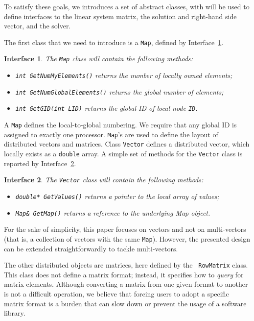 \documentclass[acmtocl]{acmtrans2m}
\newtheorem{interface}{Interface}[section]
\begin{document}
To satisfy these goals, we introduces a set of abstract classes, with will be
used to define interfaces to the linear system matrix, the solution and
right-hand side vector, and the solver.

\smallskip

The first class that we need to introduce is a {\tt Map}, defined by
Interface~\ref{int:map}.
\begin{interface}
\label{int:map}
The {\tt Map} class will contain the following methods:

\begin{itemize}
\item {\tt int GetNumMyElements()} returns the number of locally owned elements;
\item {\tt int GetNumGlobalElements()} returns the global number of elements;
\item {\tt int GetGID(int LID)} returns the global ID of local node {\tt ID}.
\end{itemize}
\end{interface}
A {\tt Map} defines the local-to-global numbering. We require that any global
ID is assigned to exactly one processor. {\tt Map}'s are used to define the
layout of distributed vectors and matrices. Class {\tt Vector} defines a
distributed vector, which locally exists as a {\tt double} array.
A simple set of methods for the {\tt Vector} class is reported by Interface~\ref{int:vector}.

\begin{interface}
\label{int:vector}
The {\tt Vector} class will contain the following methods:

\begin{itemize}
\item {\tt double* GetValues()} returns a pointer to the local array of values;
\item {\tt Map\& GetMap()} returns a reference to the underlying Map object.
\end{itemize}
\end{interface}

For the sake of simplicity, this paper focuses on vectors and not on
multi-vectors (that is, a collection of vectors with the same {\tt Map}).
However, the presented design can be extended straightforwardly to tackle
multi-vectors.

\smallskip

The other distributed objects are matrices, here defined by the {\tt
  RowMatrix} class.  This class does not define a matrix format; instead, it
  specifies how to {\sl query} for matrix elements. Although converting a
  matrix from one given format to another is not a difficult operation,
we believe that forcing
users to adopt a specific matrix format is a burden that can slow down or
prevent the usage of a software library.
\end{document}
